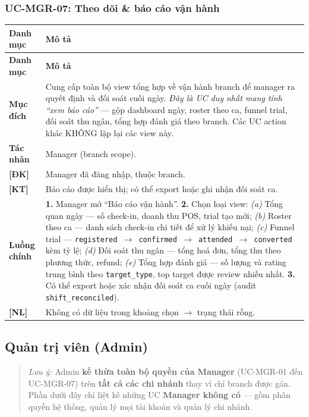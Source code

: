 \subsubsection{UC-MGR-07: Theo dõi \& báo cáo vận hành}
\begingroup
\renewcommand{\arraystretch}{1.3}
\begin{longtable}{|>{\centering\arraybackslash}m{3cm}|>{\raggedright\arraybackslash}m{12cm}|}
\hline
\textbf{Danh mục} & \textbf{Mô tả} \\ \hline
\endfirsthead
\hline
\textbf{Danh mục} & \textbf{Mô tả} \\ \hline
\endhead
\hline
\endfoot
\textbf{Mục đích} & Cung cấp toàn bộ view tổng hợp về vận hành branch để manager ra quyết định và đối soát cuối ngày. \emph{Đây là UC duy nhất mang tính ``xem báo cáo''} — gộp dashboard ngày, roster theo ca, funnel trial, đối soát thu ngân, tổng hợp đánh giá theo branch. Các UC action khác KHÔNG lặp lại các view này. \\
\hline
\textbf{Tác nhân} & Manager (branch scope). \\
\hline
\textbf{[ĐK]} & Manager đã đăng nhập, thuộc branch. \\
\hline
\textbf{[KT]} & Báo cáo được hiển thị; có thể export hoặc ghi nhận đối soát ca. \\
\hline
\textbf{Luồng chính} & \textbf{1.} Manager mở ``Báo cáo vận hành''. \textbf{2.} Chọn loại view: \emph{(a)} Tổng quan ngày — số check-in, doanh thu POS, trial tạo mới; \emph{(b)} Roster theo ca — danh sách check-in chi tiết để xử lý khiếu nại; \emph{(c)} Funnel trial — \texttt{registered $\rightarrow$ confirmed $\rightarrow$ attended $\rightarrow$ converted} kèm tỷ lệ; \emph{(d)} Đối soát thu ngân — tổng hoá đơn, tổng thu theo phương thức, refund; \emph{(e)} Tổng hợp đánh giá — số lượng và rating trung bình theo \texttt{target\_type}, top target được review nhiều nhất. \textbf{3.} Có thể export hoặc xác nhận đối soát ca cuối ngày (audit \texttt{shift\_reconciled}). \\
\hline
\textbf{[NL]} & Không có dữ liệu trong khoảng chọn $\rightarrow$ trạng thái rỗng. \\
\hline
\end{longtable}
\endgroup

\subsection{Quản trị viên (Admin)}

\begin{quote}
\emph{Lưu ý:} Admin \textbf{kế thừa toàn bộ quyền của Manager} (UC-MGR-01 đến UC-MGR-07) trên \textbf{tất cả các chi nhánh} thay vì chỉ branch được gán. Phần dưới đây chỉ liệt kê những UC \textbf{Manager không có} — gồm phân quyền hệ thống, quản lý mọi tài khoản và quản lý chi nhánh.
\end{quote}

